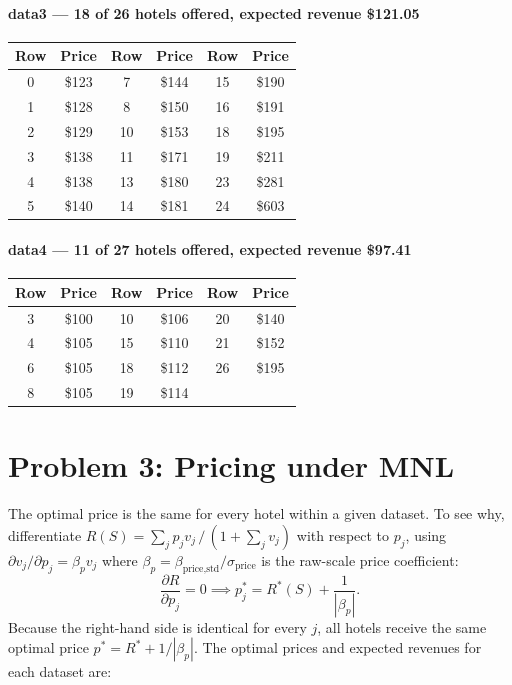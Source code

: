 \documentclass[11pt]{article}
\begin{document}
\paragraph{data3 \textnormal{--- 18 of 26 hotels offered, expected revenue \$121.05}}
\begin{center}\small
\begin{tabular}{cc|cc|cc}
\toprule
Row & Price & Row & Price & Row & Price \\
\midrule
 0 & \$123 &  7 & \$144 & 15 & \$190 \\
 1 & \$128 &  8 & \$150 & 16 & \$191 \\
 2 & \$129 & 10 & \$153 & 18 & \$195 \\
 3 & \$138 & 11 & \$171 & 19 & \$211 \\
 4 & \$138 & 13 & \$180 & 23 & \$281 \\
 5 & \$140 & 14 & \$181 & 24 & \$603 \\
\bottomrule
\end{tabular}
\end{center}

\paragraph{data4 \textnormal{--- 11 of 27 hotels offered, expected revenue \$97.41}}
\begin{center}\small
\begin{tabular}{cc|cc|cc}
\toprule
Row & Price & Row & Price & Row & Price \\
\midrule
 3 & \$100 & 10 & \$106 & 20 & \$140 \\
 4 & \$105 & 15 & \$110 & 21 & \$152 \\
 6 & \$105 & 18 & \$112 & 26 & \$195 \\
 8 & \$105 & 19 & \$114 &    &       \\
\bottomrule
\end{tabular}
\end{center}

\section{Problem 3: Pricing under MNL}

The optimal price is the same for every hotel within a given dataset. To see why, differentiate $R(S) = \sum_{j} p_j v_j \,/\, (1 + \sum_{j} v_j)$ with respect to $p_j$, using $\partial v_j / \partial p_j = \beta_p v_j$ where $\beta_p = \beta_{\text{price,std}} / \sigma_{\text{price}}$ is the raw-scale price coefficient:
\[
\frac{\partial R}{\partial p_j} = 0 \implies p_j^* = R^*(S) + \frac{1}{|\beta_p|}.
\]
Because the right-hand side is identical for every $j$, all hotels receive the same optimal price $p^* = R^* + 1/|\beta_p|$. The optimal prices and expected revenues for each dataset are:
\end{document}
